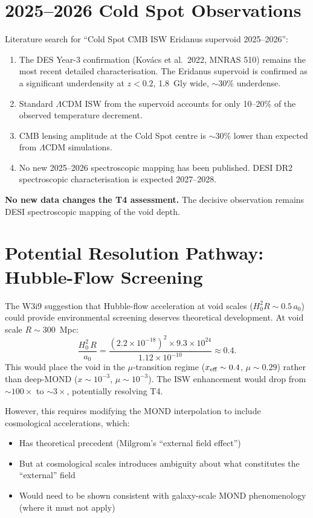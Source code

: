 \documentclass[11pt]{article}
\newcommand{\ee}[1]{\times 10^{#1}}
\begin{document}
\section{2025--2026 Cold Spot Observations}

Literature search for ``Cold Spot CMB ISW Eridanus supervoid 2025--2026'':

\begin{enumerate}[nosep]
\item The DES Year-3 confirmation (Kov\'acs et al.\ 2022, MNRAS 510)
  remains the most recent detailed characterisation. The Eridanus
  supervoid is confirmed as a significant underdensity at $z < 0.2$,
  1.8~Gly wide, $\sim 30\%$ underdense.
\item Standard $\Lambda$CDM ISW from the supervoid accounts for only
  10--20\% of the observed temperature decrement.
\item CMB lensing amplitude at the Cold Spot centre is $\sim 30\%$
  lower than expected from $\Lambda$CDM simulations.
\item No new 2025--2026 spectroscopic mapping has been published.
  DESI DR2 spectroscopic characterisation is expected 2027--2028.
\end{enumerate}

\textbf{No new data changes the T4 assessment.} The decisive observation
remains DESI spectroscopic mapping of the void depth.

\section{Potential Resolution Pathway: Hubble-Flow Screening}

The W3i9 suggestion that Hubble-flow acceleration at void scales
($H_0^2 R \sim 0.5\,a_0$) could provide environmental screening
deserves theoretical development. At void scale $R \sim 300$~Mpc:
\begin{equation}
\frac{H_0^2\,R}{a_0} = \frac{(2.2\ee{-18})^2 \times 9.3\ee{24}}{1.12\ee{-10}}
\approx 0.4.
\end{equation}
This would place the void in the $\mu$-transition regime
($x_{\rm eff} \sim 0.4$, $\mu \sim 0.29$) rather than deep-MOND
($x \sim 10^{-3}$, $\mu \sim 10^{-3}$). The ISW enhancement would
drop from $\sim 100\times$ to $\sim 3\times$, potentially resolving T4.

However, this requires modifying the MOND interpolation to include
cosmological accelerations, which:
\begin{itemize}[nosep]
\item Has theoretical precedent (Milgrom's ``external field effect'')
\item But at cosmological scales introduces ambiguity about what
  constitutes the ``external'' field
\item Would need to be shown consistent with galaxy-scale MOND
  phenomenology (where it must not apply)
\end{itemize}
\end{document}
